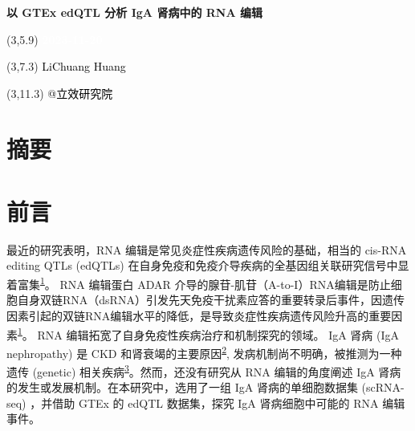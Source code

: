 \documentclass[
]{article}
\author{}
\date{\vspace{-2.5em}}
\begin{document}
\begin{titlepage} 
\begin{center} \textbf{\Huge 以 GTEx edQTL 分析
IgA 肾病中的 RNA 编辑} \vspace{4em}
\begin{textblock}{10}(3,5.9) \huge
\textbf{\textcolor{white}{2023-11-20}}
\end{textblock} \begin{textblock}{10}(3,7.3)
\Large \textcolor{black}{LiChuang Huang}
\end{textblock} \begin{textblock}{10}(3,11.3)
\Large \textcolor{black}{@立效研究院}
\end{textblock} \end{center} \end{titlepage}
\restoregeometry


\tableofcontents

\listoffigures

\listoftables

\newpage


\hypertarget{abstract}{%
\section{摘要}\label{abstract}}

\hypertarget{introduction}{%
\section{前言}\label{introduction}}

最近的研究表明，RNA 编辑是常见炎症性疾病遗传风险的基础，相当的 cis-RNA editing QTLs (edQTLs) 在自身免疫和免疫介导疾病的全基因组关联研究信号中显着富集\textsuperscript{\protect\hyperlink{ref-RnaEditingUndLiQi2022}{1}}。
RNA 编辑蛋白 ADAR 介导的腺苷-肌苷（A-to-I）RNA编辑是防止细胞自身双链RNA（dsRNA）引发先天免疫干扰素应答的重要转录后事件，因遗传因素引起的双链RNA编辑水平的降低，是导致炎症性疾病遗传风险升高的重要因素\textsuperscript{\protect\hyperlink{ref-RnaEditingUndLiQi2022}{1}}。
RNA 编辑拓宽了自身免疫性疾病治疗和机制探究的领域。
IgA 肾病 (IgA nephropathy) 是 CKD 和肾衰竭的主要原因\textsuperscript{\protect\hyperlink{ref-IgaNephropathyRodrig2017}{2}}, 发病机制尚不明确，被推测为一种遗传 (genetic) 相关疾病\textsuperscript{\protect\hyperlink{ref-ImmuneAbnormalGentil2023}{3}}。然而，还没有研究从 RNA 编辑的角度阐述 IgA 肾病的发生或发展机制。在本研究中，选用了一组 IgA 肾病的单细胞数据集 (scRNA-seq) ，并借助 GTEx 的 edQTL 数据集，探究 IgA 肾病细胞中可能的 RNA 编辑事件。
\end{document}
